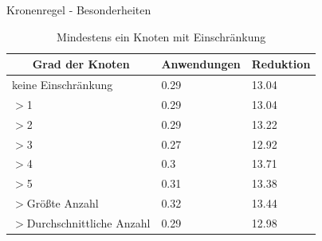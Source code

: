 \documentclass{beamer}
\begin{document}
\begin{frame}{Kronenregel - Besonderheiten}

\begin{table}[htb]
\caption{Mindestens ein Knoten mit Einschränkung\label{tab:degreeOR}}
\vspace*{1em}
\centering

\bgroup
\def\arraystretch{1.3}%


\begin{tabular}[c]{l|l|l}
	
	\multicolumn{1}{c|}{\textbf{Grad der Knoten}} & 
	\multicolumn{1}{c|}{\textbf{Anwendungen}} & 
	\multicolumn{1}{c}{\textbf{Reduktion}} \\ 
	
	\hline

	keine Einschränkung&0.29&13.04\\
	$>$1&0.29 &13.04 \\
	$>$2&0.29 &13.22 \\
	$>$3& 0.27& 12.92 \\
	$>$4& 0.3& 13.71 \\
	$>$5& 0.31&13.38 \\  
	$>$Größte Anzahl& 0.32&13.44 \\
	$>$Durchschnittliche Anzahl& 0.29&12.98 \\
	
\end{tabular}


\egroup

\end{table}

\end{frame}
\end{document}
